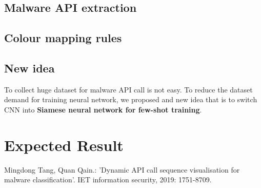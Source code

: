 \documentclass{article}
\begin{document}
\subsection{Malware API extraction}
\subsection{Colour mapping rules}
\subsection{New idea}
To collect huge dataset for malware API call is not easy. To reduce the dataset demand for training neural network, 
we proposed and new idea that is to switch CNN into \textbf{Siamese neural network for few-shot training}.



\section{Expected Result}

\begin{thebibliography}{99}  
    Mingdong Tang, Quan Qain.: 'Dynamic API call sequence visualisation for malware classification'. IET information security, 2019: 1751-8709.  
\end{thebibliography}
\end{document}
